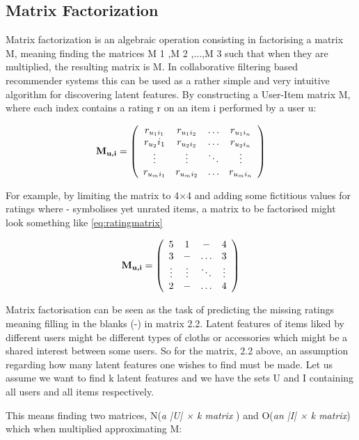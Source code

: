\subsection{Matrix Factorization}
Matrix factorization is an algebraic operation consisting in factorising a matrix M, meaning finding the matrices M 1 ,M 2 ,...,M 3 such that when they are multiplied, the resulting matrix is M. In collaborative filtering based recommender systems this can be used as a rather simple and very intuitive algorithm for discovering latent features. By constructing a User-Item matrix M, where each index contains a rating r on an item i performed by a user u:

\[

\textbf{M\textsubscript{u,i}} = \left(
\begin{array}{cccc}
r_{{u_1}{i_1}}&r_{{u_1}{i_2}}& \ldots&r_{{u_1}{i_n}} \\
r_{u_2}{i_1}&r_{{u_2}{i_2}}& \ldots&r_{{u_2}{i_n}} \\
\vdots & \vdots & \ddots & \vdots \\
r_{{u_m}{i_1}}&r_{{u_m}{i_2}}& \ldots&r_{{u_m}{i_n}}
\end{array}
\right) \label{eq:ratingmatrix}

\]

For example, by limiting the matrix to 4×4 and adding some fictitious values for ratings
where - symbolises yet unrated items, a matrix to be factorised might look something
like \eqref{eq:ratingmatrix}


\[  
\label{eq:numbermatrix}
\textbf{M\textsubscript{u,i}} = \left(
\begin{array}{cccc}
5&1& - &4 \\
3&-&\ldots&3 \\
\vdots & \vdots & \ddots & \vdots \\
2&-& \ldots&4
\end{array}
\right)
\]

Matrix factorisation can be seen as the task of predicting the missing ratings meaning filling in the blanks (-) in matrix 2.2. Latent features of items liked by different users might be different types of cloths or accessories which might be a shared interest between some users. So for the matrix, 2.2 above, an assumption regarding how many latent features one wishes to find must be made. Let us assume we want to find k latent features and we have the sets U and I containing all users and all items respectively.

This means finding two matrices, N(\textit{a  |U| × k matrix }) and O(\textit{an  |I| × k  matrix}) which when multiplied approximating M:

